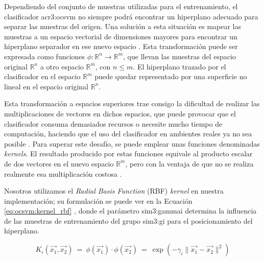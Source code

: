 Dependiendo del conjunto de muestras utilizadas para el entrenamiento,
el clasificador \gls{acr3:ocsvm} no siempre podrá encontrar un hiperplano
adecuado para separar las muestras del origen. Una solución a esta
situación es mapear las muestras a un espacio vectorial de dimensiones
mayores para encontrar un hiperplano separador en ese nuevo espacio
\cite{parhizkar2015oc}. %
Esta transformación puede ser expresada como funciones
$\phi: \mathbb{R}^{n} \rightarrow \mathbb{R}^{m}$, que llevan las muestras
del espacio original $\mathbb{R}^{n}$ a otro espacio $\mathbb{R}^{m}$,
con $n \leq m$. El hiperplano trazado por el clasificador en el espacio
$\mathbb{R}^{m}$ puede quedar representado por una superficie no lineal
en el espacio original $\mathbb{R}^{n}$.


Esta transformación a espacios superiores trae consigo la dificultad de
realizar las multiplicaciones de vectores en dichos espacios, que puede
provocar que el clasificador consuma demasiados recursos o necesite mucho
tiempo de computación, haciendo que el uso del clasificador en ambientes
reales ya no sea posible
\cite{rieck2009machine}. %
Para superar este desafío, se puede emplear unas funciones denominadas
\textit{kernels}. El resultado producido por estas funciones equivale al
producto escalar de dos vectores en el nuevo espacio $\mathbb{R}^{m}$,
pero con la ventaja de que no se realiza realmente esa multiplicación costosa
\cite{rieck2009machine}. %

Nosotros utilizamos el \textit{Radial Basis Function} (RBF) \textit{kernel}
en nuestra implementación; su formulación se puede ver en la Ecuación
\ref{eq:ocsvm:kernel_rbf}
\cite{parhizkar2015oc}, %
donde el parámetro \gls{sim3:gammai} determina la influencia de las muestras
de entrenamiento del grupo \gls{sim3:gi} para el posicionamiento del
hiperplano.

\begin{equation}
    \label{eq:ocsvm:kernel_rbf}
    K_{i}(\vec{x_{1}}, \vec{x_{2}})
    \ = \
    \phi(\vec{x_{1}}) \cdot \phi(\vec{x_{2}})
    \ = \
    \exp(
        - \gamma_{i} \lVert \vec{x_{1}} - \vec{x_{2}} \lVert^2
    )
\end{equation}


